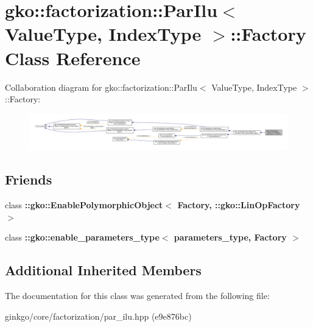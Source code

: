 \hypertarget{classgko_1_1factorization_1_1ParIlu_1_1Factory}{}\section{gko\+:\+:factorization\+:\+:Par\+Ilu$<$ Value\+Type, Index\+Type $>$\+:\+:Factory Class Reference}
\label{classgko_1_1factorization_1_1ParIlu_1_1Factory}


Collaboration diagram for gko\+:\+:factorization\+:\+:Par\+Ilu$<$ Value\+Type, Index\+Type $>$\+:\+:Factory\+:
\nopagebreak
\begin{figure}[H]
\begin{center}
\leavevmode
\includegraphics[width=350pt]{classgko_1_1factorization_1_1ParIlu_1_1Factory__coll__graph}
\end{center}
\end{figure}
\subsection*{Friends}
\begin{DoxyCompactItemize}
\item 
\mbox{\label{classgko_1_1factorization_1_1ParIlu_1_1Factory_a27e9bbc94a1c1c59f40833153eda8f78}} 
class {\bfseries \+::gko\+::\+Enable\+Polymorphic\+Object$<$ Factory, \+::gko\+::\+Lin\+Op\+Factory $>$}
\item 
\mbox{\label{classgko_1_1factorization_1_1ParIlu_1_1Factory_a0d176cbd42d6214e11aee8c30ca256fc}} 
class {\bfseries \+::gko\+::enable\+\_\+parameters\+\_\+type$<$ parameters\+\_\+type, Factory $>$}
\end{DoxyCompactItemize}
\subsection*{Additional Inherited Members}


The documentation for this class was generated from the following file\+:\begin{DoxyCompactItemize}
\item 
ginkgo/core/factorization/par\+\_\+ilu.\+hpp (e9e876bc)\end{DoxyCompactItemize}
